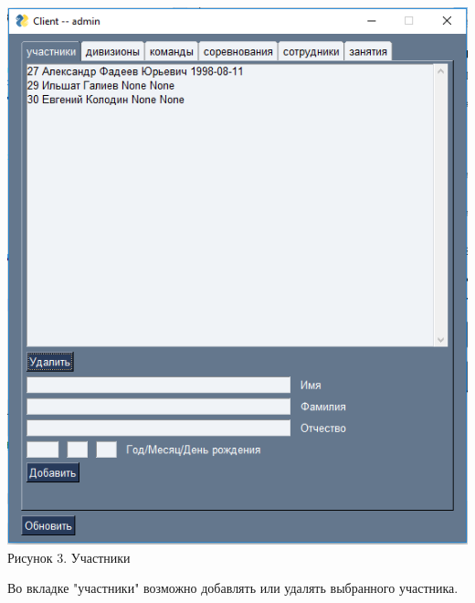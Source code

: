 \documentclass[a4paper,12pt,preview]{report} %
\begin{document}
	
	\begin{center}
		\includegraphics{members.PNG} \\
		Рисунок 3. Участники
	\end{center}
	
	Во вкладке "участники" возможно добавлять или удалять выбранного участника.
	
\end{document}
